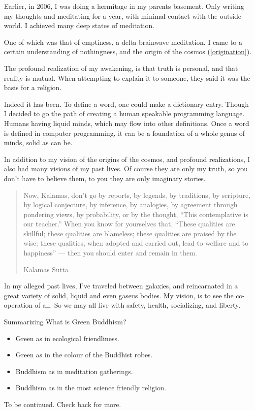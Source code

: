 \documentclass{report}
\begin{document}
Earlier, in 2006, I was doing a hermitage in my parents basement. Only writing
my thoughts and meditating for a year, with minimal contact with the outside
world. I achieved many deep states of meditation.  

One of which was that of emptiness, a delta brainwave meditation. 
I came to a certain understanding of nothingness, and the origin of the
cosmos (\ref{origination}).

The profound realization of my awakening, is that truth is personal, and that
reality is mutual. When attempting to explain it to someone, they said it was
the basis for a religion. 

Indeed it has been. To define a word, one could make a dictionary entry. Though
I decided to go the path of creating a human speakable programming language.
Humans having liquid minds, which  may flow into other definitions. Once a word
is defined in computer programming, it can be a foundation of a whole genus of
minds, solid as can be.  

In addition to my vision of the origins of the cosmos, and profound
realizations, I also had many visions of my past lives. Of course they are only
my truth, so you don't have to believe them, to you they are only imaginary
stories. 


\blockquote[Kalamas Sutta\cite{kalamas}]{Now, Kalamas, don't go by reports, by legends, by traditions, 
by scripture, by logical conjecture, by inference, by analogies, by agreement 
through pondering views, by probability, or by the thought, ``This contemplative
 is our teacher.'' When you know for yourselves that, ``These qualities are 
skillful; these qualities are blameless; these qualities are praised by the 
wise; these qualities, when adopted and carried out, lead to welfare and 
to happiness'' — then you should enter and remain in them.
}

In my alleged past lives, I've traveled between galaxies, and reincarnated in a
great variety of solid, liquid and even gaseus bodies. My vision, is to see the
co-operation of all. So we may all live with safety, health, socializing, and
liberty. 

Summarizing What is Green Buddhism?
\begin{itemize}
  \item Green as in ecological friendliness.
  \item Green as in the colour of the Buddhist robes. 
  \item Buddhism as in meditation gatherings. 
  \item Buddhism as in the most science friendly
religion\cite{kalamas}\cite{singleAtom}. 
\end{itemize}








To be continued.
Check back for more.
\end{document}
